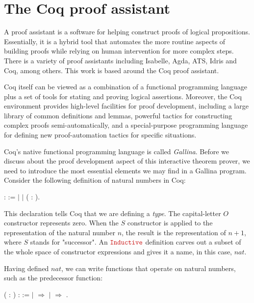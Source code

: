 \section{The Coq proof assistant}
\label{section:coq}

A proof assistant is a software for helping construct proofs of logical propositions. Essentially, it is a hybrid tool that automates the more routine aspects of building proofs while relying on human intervention for more complex steps. There is a variety of proof assistants including Isabelle, Agda, ATS, Idris and Coq, among others. This work is based around the Coq proof assistant. 

Coq itself can be viewed as a combination of a functional programming language plus a set of tools for stating and proving logical assertions. Moreover, the Coq environment provides high-level facilities for proof development, including a large library of common definitions and lemmas, powerful tactics for constructing complex proofs semi-automatically, and a special-purpose programming language for defining new proof-automation tactics for specific situations.

Coq's native functional programming language is called \emph{Gallina}. Before we discuss about the proof development aspect of this interactive theorem prover, we need to introduce the most essential elements we may find in a Gallina program. Consider the following definition of natural numbers in Coq:

\begin{coqdoccode}
	\coqdocnoindent
	  :  :=\coqdoceol
	\coqdocindent{1.00em}
	\ensuremath{|} \coqdoceol
	\coqdocindent{1.00em}
	\ensuremath{|}  ( : ).\coqdoceol
\end{coqdoccode}

This declaration tells Coq that we are defining a \emph{type}. The capital-letter $ O $ constructor represents zero. When the $ S $ constructor is applied to the representation of the natural number $ n $, the result is the representation of $ n+1 $, where $ S $ stands for "successor". An $ \coqdockw{Inductive} $ definition carves out a subset of the whole space of constructor expressions and gives it a name, in this case, $ nat $. 

Having defined $ nat $, we can write functions that operate on natural numbers, such as the predecessor function:

\begin{coqdoccode}
	\coqdocnoindent
	  ( : ) :  :=\coqdoceol
	\coqdocindent{1.00em}
	  \coqdoceol
	\coqdocindent{2.00em}
	\ensuremath{|}  \ensuremath{\Rightarrow} \coqdoceol
	\coqdocindent{2.00em}
	\ensuremath{|}   \ensuremath{\Rightarrow} \coqdoceol
	\coqdocindent{1.00em}
	.\coqdoceol
\end{coqdoccode}

